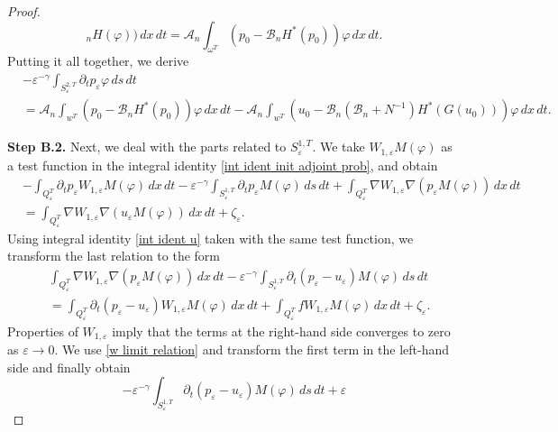 \documentclass[reqno]{amsart}
\begin{document}
\begin{proof}
\[_nH(\varphi ))\,dx\,dt=\mathcal{A}_n\int _{\omega ^{T}}(p_0-%
\mathcal{B}_nH^{\ast }(p_0))\varphi \,dx\,dt.
\]
Putting it all together, we derive
\begin{equation}
\begin{aligned}
&-\varepsilon ^{-\gamma }\int _{S_{\varepsilon }^{2,T}}\partial
_{t}p_{\varepsilon }\varphi \,ds\,dt \\
&=\mathcal{A}_n\int _{w^{T}}(p_0-%
\mathcal{B}_nH^{\ast }(p_0))\varphi \,dx\,dt
-\mathcal{A}_n\int _{w^{T}}(u_0-\mathcal{B}_n(\mathcal{B}%
_n+N^{-1})H^{\ast }(G(u_0)))\varphi \,dx\,dt.
\end{aligned}  \label{pa_t p cont}
\end{equation}

\noindent\textbf{Step B.2.}
Next, we deal with the parts related to $S_{\varepsilon}^{1,T}$. 
We take $W_{1,\varepsilon }M(\varphi )$ as a test function in the
integral identity \eqref{int ident init adjoint prob}, and obtain
\begin{align*}
&-\int _{Q_{\varepsilon }^{T}}\partial _{t}p_{\varepsilon
}W_{1,\varepsilon }M(\varphi )\,dx\,dt-\varepsilon ^{-\gamma }\int
_{S_{\varepsilon }^{1,T}}\partial _{t}p_{\varepsilon }M(\varphi ){\,ds\,dt%
}+\int _{Q_{\varepsilon }^{T}}\nabla W_{1,\varepsilon }\nabla
(p_{\varepsilon }M(\varphi ))\,dx\,dt \\
&=\int _{Q_{\varepsilon }^{T}}\nabla W_{1,\varepsilon }\nabla
(u_{\varepsilon }M(\varphi ))\,dx\,dt + \zeta _{\varepsilon }.
\end{align*}
Using integral identity \eqref{int ident u} taken with the same test
function, we transform the last relation to the form
\begin{align*}
&\int _{Q_{\varepsilon }^{T}}\nabla W_{1,\varepsilon }\nabla
(p_{\varepsilon }M(\varphi ))\,dx\,dt-\varepsilon ^{-\gamma }\int
_{S_{\varepsilon }^{1,T}}\partial _{t}(p_{\varepsilon
}-u_{\varepsilon })M(\varphi )\,ds\,dt \\
&=\int _{Q_{\varepsilon }^{T}}\partial _{t}(p_{\varepsilon
}-u_{\varepsilon })W_{1,\varepsilon }M(\varphi )\,dx\,dt+\int
_{Q_{\varepsilon }^{T}}fW_{1,\varepsilon }M(\varphi )\,dx\,dt+\zeta
_{\varepsilon }.
\end{align*}
Properties of $W_{1,\varepsilon }$ imply that the terms at the right-hand
side converges to zero as $\varepsilon \to 0$. We use
\eqref{w limit relation} and transform the first term in the left-hand side 
and finally obtain
\[
-\varepsilon ^{-\gamma }\int _{S_{\varepsilon }^{1,T}}\partial
_{t}(p_{\varepsilon }-u_{\varepsilon })M(\varphi )\,ds\,dt+\varepsilon
\]
\end{proof}
\end{document}

